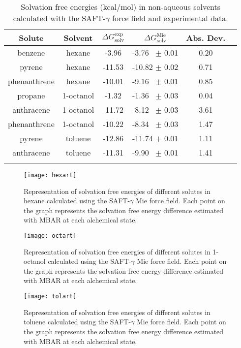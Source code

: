 \documentclass[preprint]{elsarticle}
\begin{document}
	\begin{table*}
		\centering
		\caption{Solvation free energies (kcal/mol) in non-aqueous solvents calculated with the SAFT-$\gamma$ force field and experimental data.}
		\label{tbl:solv1}
		\begin{tabular}{cccccc}
			\hline\hline
			Solute       & Solvent   & $\Delta G_\text{solv}^\text{exp}$ & $\Delta G_\text{solv}^\text{Mie}$ & Abs. Dev.  \\ \hline
			benzene      & hexane    & -3.96                   & -3.76  $\,$ $\pm$ 0.01       & 0.20      &  \\
			pyrene       & hexane    & -11.53                  & -10.82 $\pm$ 0.02       & 0.71      &  \\
			phenanthrene & hexane    & -10.01                  & -9.16  $\,$ $\pm$ 0.01       & 0.85      &  \\
			propane      & 1-octanol & -1.32                   & -1.36  $\,$ $\pm$ 0.03       & 0.04      &  \\
			anthracene   & 1-octanol & -11.72                  & -8.12   $\,$ $\pm$ 0.03       & 3.61      &  \\
			phenanthrene & 1-octanol & -10.22                  & -8.34  $\,$ $\pm$ 0.03       & 1.47      &  \\
			pyrene       & toluene   & -12.86                  & -11.74 $\pm$ 0.01       & 1.11      &  \\
			anthracene   & toluene   & -11.31                  & -9.90 $\,$ $\pm$ 0.01        & 1.41      &  \\ \hline\hline
			&
		\end{tabular}
	\end{table*}
	\begin{figure}
		\centering
		\texttt{[image: hexart]}
		\caption{Representation of solvation free energies of different solutes in hexane calculated using the SAFT-$\gamma$ Mie force field. Each point on the graph represents the solvation free energy difference estimated with MBAR at each alchemical state.}
		\label{fig:hex}
	\end{figure}
	\begin{figure}
		\centering
		\texttt{[image: octart]}
		\caption{Representation of solvation free energies of different solutes in 1-octanol calculated using the SAFT-$\gamma$ Mie force field. Each point on the graph represents the solvation free energy difference estimated with MBAR at each alchemical state.}
		\label{fig:oct}
	\end{figure}
	\begin{figure}
		\centering
		\texttt{[image: tolart]}
		\caption{Representation of solvation free energies of different solutes in toluene calculated using the SAFT-$\gamma$ Mie force field. Each point on the graph represents the solvation free energy difference estimated with MBAR at each alchemical state. }
		\label{fig:tol}
	\end{figure}
	
\end{document}
